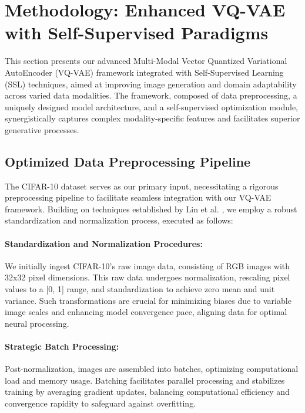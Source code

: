 \section{Methodology: Enhanced VQ-VAE with Self-Supervised Paradigms}

This section presents our advanced Multi-Modal Vector Quantized Variational AutoEncoder (VQ-VAE) framework integrated with Self-Supervised Learning (SSL) techniques, aimed at improving image generation and domain adaptability across varied data modalities. The framework, composed of data preprocessing, a uniquely designed model architecture, and a self-supervised optimization module, synergistically captures complex modality-specific features and facilitates superior generative processes.

\subsection{Optimized Data Preprocessing Pipeline}

The CIFAR-10 dataset serves as our primary input, necessitating a rigorous preprocessing pipeline to facilitate seamless integration with our VQ-VAE framework. Building on techniques established by Lin et al. \cite{lin2014microsoft}, we employ a robust standardization and normalization process, executed as follows:

\paragraph{Standardization and Normalization Procedures:} 

We initially ingest CIFAR-10's raw image data, consisting of RGB images with 32x32 pixel dimensions. This raw data undergoes normalization, rescaling pixel values to a [0, 1] range, and standardization to achieve zero mean and unit variance. Such transformations are crucial for minimizing biases due to variable image scales and enhancing model convergence pace, aligning data for optimal neural processing.

\paragraph{Strategic Batch Processing:} 

Post-normalization, images are assembled into batches, optimizing computational load and memory usage. Batching facilitates parallel processing and stabilizes training by averaging gradient updates, balancing computational efficiency and convergence rapidity to safeguard against overfitting. 

